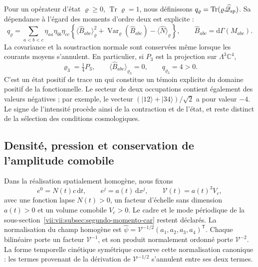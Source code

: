 Pour un opérateur d'état \(\varrho\geq0\),
\(\operatorname{Tr}\varrho=1\), nous définissons
\(q_\varrho=\operatorname{Tr}(\varrho\widehat{\mathscr Q}_{\rm sp})\).
Sa dépendance à l'égard des moments d'ordre deux est explicite :
\begin{equation}
 q_\varrho=\sum_{a<b<c}\eta_{aa}\eta_{bb}\eta_{cc}
 \left\{
  \langle\widehat B_{abc}\rangle_\varrho^2
  +\operatorname{Var}_\varrho(\widehat B_{abc})
  -\langle\widehat N\rangle_\varrho
 \right\},\qquad
 \widehat B_{abc}=\mathrm d\Gamma(M_{abc}).
 \label{vii:vii:eq:covarianza-espin-material}
\end{equation}
La covariance et la soustraction normale sont conservées même lorsque
les courants moyens s'annulent. En particulier, si \(P_3\) est la
projection sur \(\Lambda^3\mathbb C^4\),
\begin{equation}
 \varrho_3=\tfrac14P_3,\qquad
 \langle\widehat B_{abc}\rangle_{\varrho_3}=0,\qquad
 q_{\varrho_3}=4>0.
 \label{vii:vii:eq:testigo-positivo-espin}
\end{equation}
C'est un état positif de trace un qui constitue un témoin explicite
du domaine positif de la fonctionnelle. Le secteur de deux occupations
contient également des valeurs négatives ; par exemple, le vecteur
\((|12\rangle+|34\rangle)/\sqrt2\) a pour valeur \(-4\).
Le signe de l'intensité procède ainsi de la contraction et de
l'état, et reste distinct de la sélection des conditions cosmologiques.

\subsection{Densité, pression et conservation de l'amplitude comobile}
\label{vii:vii:subsec:amplitud-espinorial-comovil}

Dans la réalisation spatialement homogène, nous fixons
\[
 e^0=N(t)c\,\mathrm dt,\qquad e^j=a(t)\,\mathrm dx^j,
 \qquad \mathcal V(t)=a(t)^3V_c,
\]
avec une fonction lapse \(N(t)>0\), un facteur d'échelle sans dimension \(a(t)>0\)
et un volume comobile \(V_c>0\). Le cadre et le mode périodique de la
sous-section~\ref{vii:vii:subsec:segundo-momento-car} restent déclarés.
La normalisation du champ homogène est
\(\widehat\psi=\mathcal V^{-1/2}(a_1,a_2,a_3,a_4)^{\mathsf T}\).
Chaque bilinéaire porte un facteur \(\mathcal V^{-1}\), et son produit
normalement ordonné porte \(\mathcal V^{-2}\). La forme temporelle
cinétique symétrique conserve cette normalisation canonique : les termes
provenant de la dérivation de \(\mathcal V^{-1/2}\) s'annulent entre
ses deux termes.

